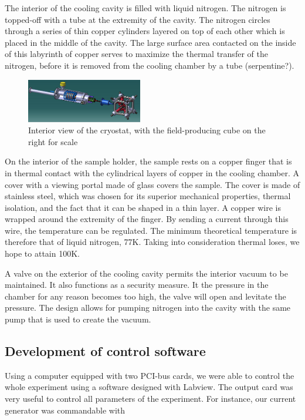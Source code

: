 \documentclass[journal]{IEEEtran}
\begin{document}
The interior of the cooling cavity is filled with liquid nitrogen. The nitrogen is topped-off with a tube at the extremity of the cavity. The nitrogen circles through a series of thin copper cylinders layered on top of each other which is placed in the middle of the cavity. The large surface area contacted on the inside of this labyrinth of copper serves to maximize the thermal transfer of the nitrogen, before it is removed from the cooling chamber by a tube (serpentine?).

\begin{figure}[h]
\includegraphics[width=0.45\textwidth]{Cryo_1.jpg}
\caption{Interior view of the cryostat, with the field-producing cube on the right for scale}
\end{figure}

On the interior of the sample holder, the sample rests on a copper finger that is in thermal contact with the cylindrical layers of copper in the cooling chamber. A cover with a viewing portal made of glass covers the sample. The cover is made of stainless steel, which was chosen for its superior mechanical properties, thermal isolation, and the fact that it can be shaped in a thin layer. A copper wire is wrapped around the extremity of the finger. By sending a current through this wire, the temperature can be regulated. The minimum theoretical temperature is therefore that of liquid nitrogen, 77K. Taking into consideration thermal loses, we hope to attain 100K.

A valve on the exterior of the cooling cavity permits the interior vacuum to be maintained. It also functions as a security measure. It the pressure in the chamber for any reason becomes too high, the valve will open and levitate the pressure. The design allows for pumping nitrogen into the cavity with the same pump that is used to create the vacuum.

\subsection{Development of control software}

Using a computer equipped with two PCI-bus cards, we were able to control the whole experiment using a software designed with Labview. The output card was very useful to control all parameters of the experiment. For instance, our current generator was commandable with 
\end{document}
